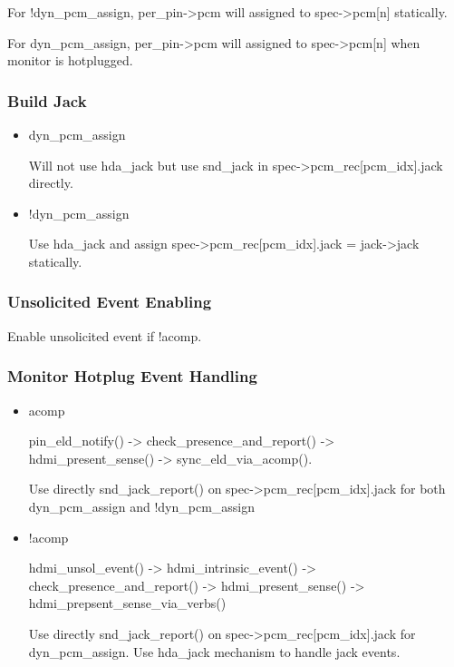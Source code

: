 \documentclass[a4paper,8pt,english]{sphinxmanual}
\begin{document}
For !dyn\_pcm\_assign, per\_pin-\textgreater{}pcm will assigned to spec-\textgreater{}pcm{[}n{]} statically.

For dyn\_pcm\_assign, per\_pin-\textgreater{}pcm will assigned to spec-\textgreater{}pcm{[}n{]}
when monitor is hotplugged.


\subsubsection{Build Jack}
\label{sound/hd-audio/dp-mst:build-jack}\begin{itemize}
\item {} 
dyn\_pcm\_assign

Will not use hda\_jack but use snd\_jack in spec-\textgreater{}pcm\_rec{[}pcm\_idx{]}.jack directly.

\item {} 
!dyn\_pcm\_assign

Use hda\_jack and assign spec-\textgreater{}pcm\_rec{[}pcm\_idx{]}.jack = jack-\textgreater{}jack statically.

\end{itemize}


\subsubsection{Unsolicited Event Enabling}
\label{sound/hd-audio/dp-mst:unsolicited-event-enabling}
Enable unsolicited event if !acomp.


\subsubsection{Monitor Hotplug Event Handling}
\label{sound/hd-audio/dp-mst:monitor-hotplug-event-handling}\begin{itemize}
\item {} 
acomp

pin\_eld\_notify() -\textgreater{} check\_presence\_and\_report() -\textgreater{} hdmi\_present\_sense() -\textgreater{}
sync\_eld\_via\_acomp().

Use directly snd\_jack\_report() on spec-\textgreater{}pcm\_rec{[}pcm\_idx{]}.jack for
both dyn\_pcm\_assign and !dyn\_pcm\_assign

\item {} 
!acomp

hdmi\_unsol\_event() -\textgreater{} hdmi\_intrinsic\_event() -\textgreater{} check\_presence\_and\_report() -\textgreater{}
hdmi\_present\_sense() -\textgreater{} hdmi\_prepsent\_sense\_via\_verbs()

Use directly snd\_jack\_report() on spec-\textgreater{}pcm\_rec{[}pcm\_idx{]}.jack for dyn\_pcm\_assign.
Use hda\_jack mechanism to handle jack events.

\end{itemize}
\end{document}
